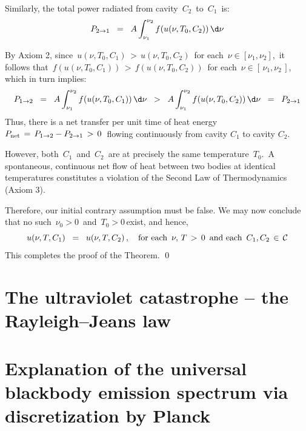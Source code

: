 \vskip 0.2cm
\noindent
Similarly, the total power radiated from cavity \,$C_{2}$\, to \,$C_{1}$\, is:
\begin{equation*}
P_{2 \rightarrow 1}
\;\; = \;\;
    A \int_{\nu_{1}}^{\nu_{2}} f(u(\nu, T_{0}, C_{2})) \, \d\nu
\end{equation*}

\vskip 0.2cm
\noindent
By Axiom 2, since
\,$u(\nu, T_{0}, C_{1}) \,>\, u(\nu, T_{0}, C_{2})$\,
for each 
\,$\nu \in [\nu_{1}, \nu_{2}]$,\,
it follows that
\,$f(u(\nu, T_{0}, C_{1})) \,>\, f(u(\nu, T_{0}, C_{2}))$\,
for each 
\,$\nu \in [\,\nu_{1}, \nu_{2}\,]$,\,
which in turn implies:
\begin{equation*}
P_{1 \rightarrow 2}
\;\; = \;\;
    A \int_{\nu_{1}}^{\nu_{2}} f(u(\nu, T_{0}, C_{1})) \, \d\nu
\;\; > \;\;
    A \int_{\nu_{1}}^{\nu_{2}} f(u(\nu, T_{0}, C_{2})) \, \d\nu
\;\; = \;\;
    P_{2 \rightarrow 1}
\end{equation*}
Thus, there is a net transfer per unit time of heat energy
\,$P_{\textnormal{net}} \,=\, P_{1 \to 2} - P_{2 \to 1} \,>\, 0$\,
flowing continuously from cavity $C_{1}$ to cavity $C_{2}$.

\vskip 0.2cm
\noindent
However, both \,$C_{1}$\, and \,$C_{2}$\, are
at precisely the same temperature \,$T_{0}$.\,
A spontaneous, continuous net flow of heat between two bodies
at identical temperatures constitutes a violation of
the Second Law of Thermodynamics (Axiom 3).

\vskip 0.2cm
\noindent
Therefore, our initial contrary assumption must be false.
We may now conclude that no such
\,$\nu_0 > 0$\, and \,$T_{0} > 0$\,exist,
and hence,
\begin{equation*}
u(\nu, T, C_{1})
\;\; = \;\;
    u(\nu, T, C_{2})\,,
\quad
\textnormal{for each \,$\nu,\, T \,>\, 0$\, and each \,$C_{1}, C_{2} \,\in\, \mathcal{C}$}
\end{equation*}
This completes the proof of the Theorem.
\qed


\section{The ultraviolet catastrophe -- the Rayleigh–Jeans law}


\section{Explanation of the universal blackbody emission spectrum via discretization by Planck}


